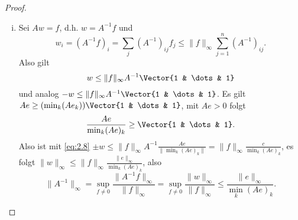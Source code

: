 \begin{st}[$M$-Kriterium]
\begin{proof}
\begin{enumerate}[i)]
\begin{segnb}{\ProofImplication*}
				\end{segnb}
			\item
				Sei $Aw = f$, d.h. $w = A^{-1} f$ und
				\[
					w_i = (A^{-1}f)_i = \sum_{j} (A^{-1})_{ij} f_j \le \|f\|_\infty \sum_{j=1}^n (A^{-1})_{ij}.
				\]
				Also gilt
				\begin{equation} \label{eq:2.8}
					w \le \|f\|_\infty A^{-1} \Vector{1 & \dots & 1}
				\end{equation}
				und analog $-w \le \|f\|_\infty A^{-1} \Vector{1 & \dots & 1}$.
				Es gilt $Ae \ge (\min_k (Ae_k)) \Vector{1 & \dots & 1}$, mit $Ae > 0$ folgt
				\[
					\frac{Ae}{\min_k (Ae)_k} \ge \Vector{1 & \dots & 1}.
				\]
				Also ist mit \eqref{eq:2.8} $\pm w \le \|f\|_\infty A^{-1} \frac{Ae}{\|\min_k (Ae)_k\|} = \|f\|_\infty \frac{c}{\min_k (Ae)_k}$, es folgt $\|w\|_\infty \le \|f\|_\infty \frac{\|e\|_\infty}{\min_k(Ae)_k}$, also
				\[
					\|A^{-1}\|_\infty
					= \sup_{f\neq 0} \frac{\|A^{-1} f\|_\infty}{\|f\|_\infty}
					= \sup_{f \neq 0} \frac{\|w\|_\infty}{\|f\|_\infty}
					\le \frac{\|e\|_\infty}{\min_k (Ae)_k}.
				\]
		\end{enumerate}
	\end{proof}
\end{st}

